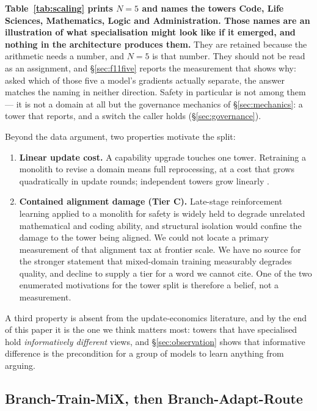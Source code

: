 \documentclass[11pt]{article}
\begin{document}
\textbf{Table~\ref{tab:scaling} prints $N = 5$ and names the towers Code, Life Sciences, Mathematics, Logic and Administration. Those names are an illustration of what specialisation might look like if it emerged, and nothing in the architecture produces them.} They are retained because the arithmetic needs a number, and $N = 5$ is that number. They should not be read as an assignment, and \S\ref{sec:f11five} reports the measurement that shows why: asked which of those five a model's gradients actually separate, the answer matches the naming in neither direction. Safety in particular is not among them --- it is not a domain at all but the governance mechanics of \S\ref{sec:mechanics}: a tower that reports, and a switch the caller holds (\S\ref{sec:governance}).

Beyond the data argument, two properties motivate the split:

\begin{enumerate}[label=(T\arabic*),itemsep=2pt]
\item \textbf{Linear update cost.} A capability upgrade touches one tower. Retraining a monolith to revise a domain means full reprocessing, at a cost that grows quadratically in update rounds; independent towers grow linearly \cite{morrison2026bar}.
\item \textbf{Contained alignment damage (Tier C).} Late-stage reinforcement learning applied to a monolith for safety is widely held to degrade unrelated mathematical and coding ability, and structural isolation would confine the damage to the tower being aligned. We could not locate a primary measurement of that alignment tax at frontier scale. We have no source for the stronger statement that mixed-domain training measurably degrades quality, and decline to supply a tier for a word we cannot cite. One of the two enumerated motivations for the tower split is therefore a belief, not a measurement.
\end{enumerate}

A third property is absent from the update-economics literature, and by the end of this paper it is the one we think matters most: towers that have specialised hold \emph{informatively different} views, and \S\ref{sec:observation} shows that informative difference is the precondition for a group of models to learn anything from arguing.

\subsection{Branch-Train-MiX, then Branch-Adapt-Route}
\label{sec:btx}
\end{document}
